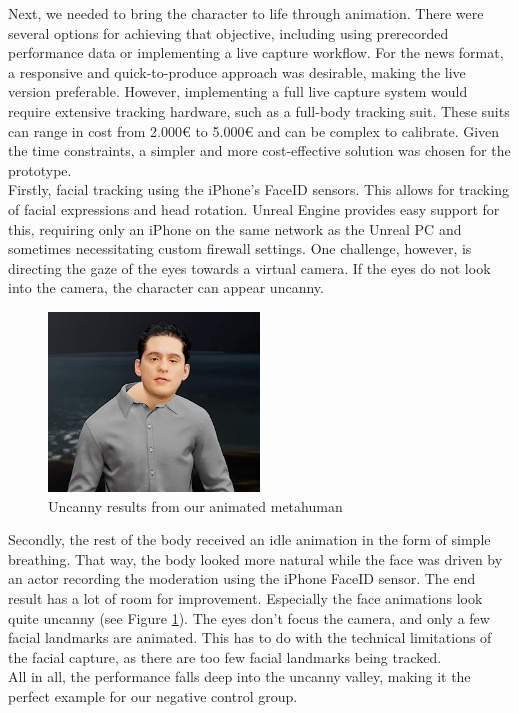 \documentclass[
  a4paper,  %
  twoside,  %
  bibliography=totoc,
  headsepline,
  cleardoublepage=empty,
  parskip=half,
  draft=false
]{scrbook}
\begin{document}
Next, we needed to bring the character to life through animation. There were several options for achieving that objective, including using prerecorded performance data or implementing a live capture workflow. For the news format, a responsive and quick-to-produce approach was desirable, making the live version preferable. However, implementing a full live capture system would require extensive tracking hardware, such as a full-body tracking suit. These suits can range in cost from 2.000€ to 5.000€ and can be complex to calibrate. Given the time constraints, a simpler and more cost-effective solution was chosen for the prototype. \\
Firstly, facial tracking using the iPhone's FaceID sensors. This allows for tracking of facial expressions and head rotation. Unreal Engine provides easy support for this, requiring only an iPhone on the same network as the Unreal PC and sometimes necessitating custom firewall settings. One challenge, however, is directing the gaze of the eyes towards a virtual camera. If the eyes do not look into the camera, the character can appear uncanny. 
\begin{figure}[h]
  \centering
  \includegraphics[width=0.5\textwidth]{graphics/images/unreal-engine/MH/bent-head.png}
  \caption{Uncanny results from our animated metahuman}
  \label{fig:uncanny mh}
\end{figure}
Secondly, the rest of the body received an idle animation in the form of simple breathing. That way, the body looked more natural while the face was driven by an actor recording the moderation using the iPhone FaceID sensor. The end result has a lot of room for improvement. Especially the face animations look quite uncanny (see Figure \ref{fig:uncanny mh}). The eyes don't focus the camera, and only a few facial landmarks are animated. This has to do with the technical limitations of the facial capture, as there are too few facial landmarks being tracked. \\
All in all, the performance falls deep into the uncanny valley, making it the perfect example for our negative control group.
\end{document}

